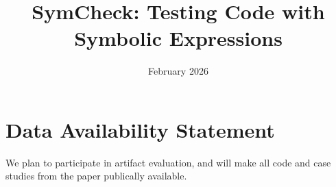 \documentclass[acmsmall,screen,review,anonymous,nonacm]{acmart}
\date{February 2026}
\title{SymCheck: Testing Code with Symbolic Expressions}
\begin{document}
\maketitle













\section*{Data Availability Statement}
We plan to participate in artifact evaluation,
and will make all code and case studies from the paper publically available.




\newpage

\end{document}
